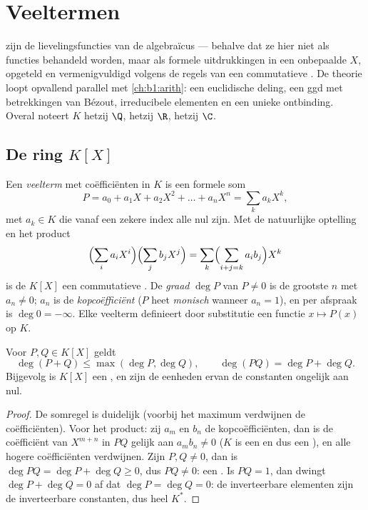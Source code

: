 \chapter{Veeltermen}\label{ch:b1:poly}

 zijn de lievelingsfuncties van de algebraïcus --- behalve dat
ze hier niet als functies behandeld worden, maar als formele
uitdrukkingen in een onbepaalde $X$, opgeteld en vermenigvuldigd volgens
de regels van een commutatieve . De theorie loopt opvallend parallel
met \cref{ch:b1:arith}: een euclidische deling, een ggd met betrekkingen
van Bézout, irreducibele elementen en een unieke ontbinding. Overal
noteert $K$ hetzij $\Q$, hetzij $\R$, hetzij $\C$.

\section{De ring $K[X]$}

\begin{definition}\label{def:b1:poly:def}
Een \emph{veelterm} met coëfficiënten in $K$ is een
formele som
\[
P = a_0 + a_1 X + a_2 X^2 + \dots + a_n X^n
= \sum_{k} a_k X^k,
\]
met $a_k \in K$ die vanaf een zekere index alle nul zijn. Met de
natuurlijke optelling en het product
\[
\Bigl(\sum_i a_i X^i\Bigr)\Bigl(\sum_j b_j X^j\Bigr)
= \sum_k \Bigl(\sum_{i+j=k} a_i b_j\Bigr) X^k
\]
is de  $K[X]$ een commutatieve . De \emph{graad} $\deg P$
van $P \neq 0$ is de grootste $n$ met $a_n \neq 0$; $a_n$ is de
\emph{kopcoëfficiënt} ($P$ heet \emph{monisch}
wanneer $a_n = 1$), en per afspraak is $\deg 0 = -\infty$. Elke veelterm
definieert door substitutie een functie $x \mapsto P(x)$ op $K$.
\end{definition}

\begin{proposition}\label{prop:b1:poly:degree}
Voor $P, Q \in K[X]$ geldt
\[
\deg(P + Q) \leq \max(\deg P, \deg Q),
\qquad
\deg(PQ) = \deg P + \deg Q .
\]
Bijgevolg is $K[X]$ een , en zijn de eenheden ervan de
constanten ongelijk aan nul.
\end{proposition}

\begin{proof}
De somregel is duidelijk (voorbij het maximum verdwijnen de
coëfficiënten). Voor het product: zij $a_m$ en $b_n$ de
kopcoëfficiënten, dan is de coëfficiënt van $X^{m+n}$ in $PQ$ gelijk aan
$a_m b_n \neq 0$ ($K$ is een  en dus een ), en
alle hogere coëfficiënten verdwijnen. Zijn $P, Q \neq 0$, dan is $\deg PQ
= \deg P + \deg Q \geq 0$, dus $PQ \neq 0$: een . Is
$PQ = 1$, dan dwingt $\deg P + \deg Q = 0$ af dat $\deg P = \deg Q = 0$:
de inverteerbare elementen zijn de inverteerbare constanten, dus heel
$K^*$.
\end{proof}

